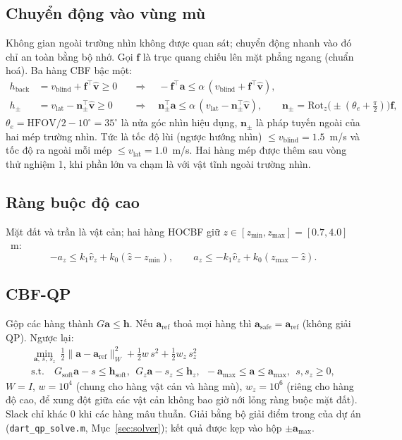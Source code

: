 \documentclass[11pt,a4paper]{article}
\numberwithin{equation}{section}
\newcommand{\vb}[1]{\bm{#1}}
\newcommand{\T}{^{\!\top}}
\newcommand{\code}[1]{\texttt{\small #1}}
\theoremstyle{definition}
\theoremstyle{plain}
\theoremstyle{remark}
\begin{document}
\subsection{Chuyển động vào vùng mù}
\label{sec:blind}
Không gian ngoài trường nhìn không được quan sát; chuyển động nhanh vào đó chỉ an toàn bằng bộ nhớ. Gọi $\vb f$ là trục quang chiếu lên mặt phẳng ngang (chuẩn hoá). Ba hàng CBF bậc một:
\begin{align}
h_{\text{back}}&=v_{\text{blind}}+\vb f\T\hat{\vb v}\ge0 &&\Rightarrow\quad -\vb f\T\vb a\le\alpha\,(v_{\text{blind}}+\vb f\T\hat{\vb v}), \label{eq:blind}\\
h_{\pm}&=v_{\text{lat}}-\vb n_\pm\T\hat{\vb v}\ge0 &&\Rightarrow\quad \vb n_\pm\T\vb a\le\alpha\,(v_{\text{lat}}-\vb n_\pm\T\hat{\vb v}),\qquad \vb n_\pm=\mathrm{Rot}_z\big(\pm(\theta_e+\tfrac\pi2)\big)\vb f, \label{eq:fovrow}
\end{align}
$\theta_e=\text{HFOV}/2-10^\circ=35^\circ$ là nửa góc nhìn hiệu dụng, $\vb n_\pm$ là pháp tuyến ngoài của hai mép trường nhìn. Tức là tốc độ lùi (ngược hướng nhìn) $\le v_{\text{blind}}=1.5$~m/s và tốc độ ra ngoài mỗi mép $\le v_{\text{lat}}=1.0$~m/s. Hai hàng mép được thêm sau vòng thử nghiệm 1, khi phần lớn va chạm là với vật tĩnh ngoài trường nhìn.

\subsection{Ràng buộc độ cao}
Mặt đất và trần là vật cản; hai hàng HOCBF giữ $z\in[z_{\min},z_{\max}]=[0.7,4.0]$~m:
\begin{equation}
-a_z\le k_1\hat v_z+k_0(\hat z-z_{\min}),\qquad a_z\le-k_1\hat v_z+k_0(z_{\max}-\hat z). \label{eq:alt}
\end{equation}

\subsection{CBF-QP}
Gộp các hàng thành $G\vb a\le\vb h$. Nếu $\vb a_{\text{ref}}$ thoả mọi hàng thì $\vb a_{\text{safe}}=\vb a_{\text{ref}}$ (không giải QP). Ngược lại:
\begin{gather}
\min_{\vb a,\,s,\,s_z}\ \tfrac12\|\vb a-\vb a_{\text{ref}}\|_W^2+\tfrac12w\,s^2+\tfrac12w_z\,s_z^2\nonumber\\
\text{s.t.}\quad G_{\text{soft}}\vb a-s\le\vb h_{\text{soft}},\ \ G_z\vb a-s_z\le\vb h_z,\ \ -\vb a_{\max}\le\vb a\le\vb a_{\max},\ \ s,s_z\ge0, \label{eq:cbfqp}
\end{gather}
$W=I$, $w=10^4$ (chung cho hàng vật cản và hàng mù), $w_z=10^6$ (riêng cho hàng độ cao, để xung đột giữa các vật cản không bao giờ nới lỏng ràng buộc mặt đất). Slack chỉ khác 0 khi các hàng mâu thuẫn. Giải bằng bộ giải điểm trong của dự án (\code{dart\_qp\_solve.m}, Mục~\ref{sec:solver}); kết quả được kẹp vào hộp $\pm\vb a_{\max}$.
\end{document}
